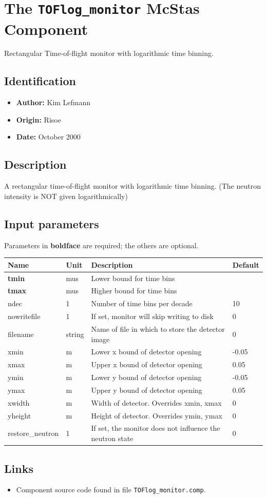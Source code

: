 \section{The \texttt{TOFlog\_monitor} McStas Component}
Rectangular Time-of-flight monitor with logarithmic time binning.

\subsection*{Identification}
\begin{itemize}
  \item \textbf{Author:} Kim Lefmann
  \item \textbf{Origin:} Risoe
  \item \textbf{Date:} October 2000
\end{itemize}

\subsection*{Description}
A rectangular time-of-flight monitor with logarithmic time binning. (The neutron intensity is NOT given logarithmically)

\subsection*{Input parameters}
Parameters in \textbf{boldface} are required; the others are optional.

\begin{longtable}{p{}p{}p{}p{}}
\toprule
\textbf{Name} & \textbf{Unit} & \textbf{Description} & \textbf{Default} \\
\midrule
\endhead
\textbf{tmin} & mus & Lower bound for time bins &  \\
\textbf{tmax} & mus & Higher bound for time bins &  \\
ndec & 1 & Number of time bins per decade & 10 \\
nowritefile & 1 & If set, monitor will skip writing to disk & 0 \\
filename & string & Name of file in which to store the detector image & 0 \\
xmin & m & Lower x bound of detector opening & -0.05 \\
xmax & m & Upper x bound of detector opening & 0.05 \\
ymin & m & Lower y bound of detector opening & -0.05 \\
ymax & m & Upper y bound of detector opening & 0.05 \\
xwidth & m & Width of detector. Overrides xmin, xmax & 0 \\
yheight & m & Height of detector. Overrides ymin, ymax & 0 \\
restore\_neutron & 1 & If set, the monitor does not influence the neutron state & 0 \\
\bottomrule
\end{longtable}

\subsection*{Links}
\begin{itemize}
  \item Component source code found in file \texttt{TOFlog\_monitor.comp}.
\end{itemize}
